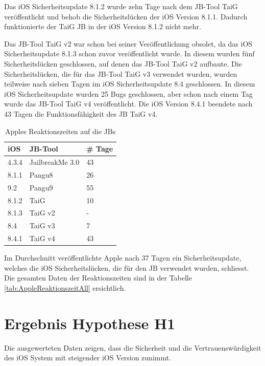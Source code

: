 Das iOS Sicherheitsupdate 8.1.2 wurde zehn Tage nach dem JB-Tool TaiG veröffentlicht und behob die Sicherheitslücken der iOS Version 8.1.1. Dadurch funktionierte der TaiG JB in der iOS Version 8.1.2 nicht mehr.

Das JB-Tool TaiG v2 war schon bei seiner Veröffentlichung obsolet, da das iOS Sicherheitsupdate 8.1.3 schon zuvor veröffentlicht wurde. In diesem wurden fünf Sicherheitslücken geschlossen, auf denen das JB-Tool TaiG v2 aufbaute.
Die Sicherheitslücken, die für das JB-Tool TaiG v3 verwendet wurden, wurden teilweise nach sieben Tagen im iOS Sicherheitsupdate 8.4 geschlossen. In diesem iOS Sicherheitsupdate wurden 25 Bugs geschlossen, aber schon nach einem Tag wurde das JB-Tool TaiG v4 veröffentlicht. Die iOS Version 8.4.1 beendete nach 43 Tagen die Funktionsfähigkeit des JB TaiG v4.

\begin{table}[htp!]
    \begin{center}
        \begin{tabular}{| p{10mm} | p{40mm} | p{17mm} |} \hline
            \textbf{iOS} & \textbf{JB-Tool} & \textbf{\# Tage} \\ \hline 
                4.3.4 & JailbreakMe 3.0 & 43 \\ \hline
                8.1.1 & Pangu8 & 26 \\ \hline
                9.2 & Pangu9 & 55 \\ \hline
                8.1.2 & TaiG & 10  \\ \hline
                 8.1.3 & TaiG v2 & - \\ \hline
                  8.4 & TaiG v3 & 7  \\ \hline
                  8.4.1 & TaiG v4 & 43  \\ \hline
        \end{tabular} 
        \caption{Apples Reaktionszeiten auf die JBs \protect\footnotemark}
        \label{tab:AppleReaktionszeit}
    \end{center}
\end{table}
Im Durchschnitt veröffentlichte Apple nach 37 Tagen ein Sicherheitsupdate, welches die iOS Sicherheitslücken, die für den JB verwendet wurden, schliesst. Die gesamten Daten der Reaktionszeiten sind in der Tabelle \ref{tab:AppleReaktionszeitAll} ersichtlich.  
\newpage
\section{Ergebnis Hypothese H1}
\label{sec:AnalyseHypo}
Die ausgewerteten Daten zeigen, dass die Sicherheit und die Vertrauenswürdigkeit des iOS System mit steigender iOS Version zunimmt. 

